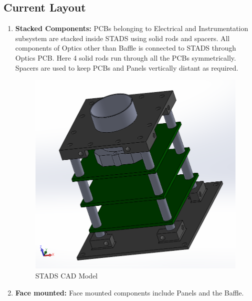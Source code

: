 \documentclass[../../main.tex]{subfiles}
\begin{document}
    \subsection{Current Layout}
    \begin{enumerate}
        \item \textbf{Stacked Components:} PCBs belonging to Electrical and Instrumentation subsystem are stacked inside STADS using solid rods and spacers. All components of Optics other than Baffle is connected to STADS through Optics PCB. Here 4 solid rods run through all the PCBs symmetrically. Spacers are used to keep PCBs and Panels vertically distant as required.
        \begin{figure}[H]
        \centering
        \includegraphics[scale=0.5]{Figures/Mechanical/stacked.png}
        \caption{STADS CAD Model}
        \label{fig:sys_CAD}
    \end{figure}
    \newpage
    \item \textbf{Face mounted:} Face mounted components include Panels and the Baffle.
        \begin{figure}[H]
        \centering

\end{figure}
\end{enumerate}
\end{document}

